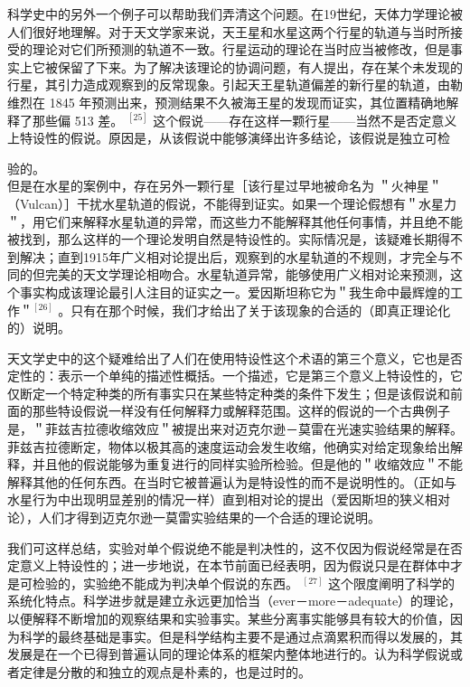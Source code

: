 科学史中的另外一个例子可以帮助我们弄清这个问题。在19世纪，天体力学理论被人们很好地理解。对于天文学家来说，天王星和水星这两个行星的轨道与当时所接受的理论对它们所预测的轨道不一致。行星运动的理论在当时应当被修改，但是事实上它被保留了下来。为了解决该理论的协调问题，有人提出，存在某个未发现的行星，其引力造成观察到的反常现象。引起天王星轨道偏差的新行星的轨道，由勒维烈在 1845 年预测出来，预测结果不久被海王星的发现而证实，其位置精确地解释了那些偏 513 差。 ${ }^{[25]}$ 这个假说——存在这样一颗行星——当然不是否定意义上特设性的假说。原因是，从该假说中能够演绎出许多结论，该假说是独立可检

验的。\\
但是在水星的案例中，存在另外一颗行星［该行星过早地被命名为 ＂火神星＂（Vulcan）］干扰水星轨道的假说，不能得到证实。如果一个理论假想有＂水星力＂，用它们来解释水星轨道的异常，而这些力不能解释其他任何事情，并且绝不能被找到，那么这样的一个理论发明自然是特设性的。实际情况是，该疑难长期得不到解决；直到1915年广义相对论提出后，观察到的水星轨道的不规则，才完全与不同的但完美的天文学理论相吻合。水星轨道异常，能够使用广义相对论来预测，这个事实构成该理论最引人注目的证实之一。爱因斯坦称它为＂我生命中最辉煌的工作＂${ }^{[26]}$ 。只有在那个时候，我们才给出了关于该现象的合适的（即真正理论化的）说明。

天文学史中的这个疑难给出了人们在使用特设性这个术语的第三个意义，它也是否定性的：表示一个单纯的描述性概括。一个描述，它是第三个意义上特设性的，它仅断定一个特定种类的所有事实只在某些特定种类的条件下发生；但是该假说和前面的那些特设假说一样没有任何解释力或解释范围。这样的假说的一个古典例子是，＂菲兹吉拉德收缩效应＂被提出来对迈克尔逊－莫雷在光速实验结果的解释。菲兹吉拉德断定，物体以极其高的速度运动会发生收缩，他确实对给定现象给出解释，并且他的假说能够为重复进行的同样实验所检验。但是他的＂收缩效应＂不能解释其他的任何东西。在当时它被普遍认为是特设性的而不是说明性的。（正如与水星行为中出现明显差别的情况一样）直到相对论的提出（爱因斯坦的狭义相对论），人们才得到迈克尔逊一莫雷实验结果的一个合适的理论说明。

我们可这样总结，实验对单个假说绝不能是判决性的，这不仅因为假说经常是在否定意义上特设性的；进一步地说，在本节前面已经表明，因为假说只是在群体中才是可检验的，实验绝不能成为判决单个假说的东西。 ${ }^{[27]}$ 这个限度阐明了科学的系统化特点。科学进步就是建立永远更加恰当（ever－more－adequate）的理论，以便解释不断增加的观察结果和实验事实。某些分离事实能够具有较大的价值，因为科学的最终基础是事实。但是科学结构主要不是通过点滴累积而得以发展的，其发展是在一个已得到普遍认同的理论体系的框架内整体地进行的。认为科学假说或者定律是分散的和独立的观点是朴素的，也是过时的。

